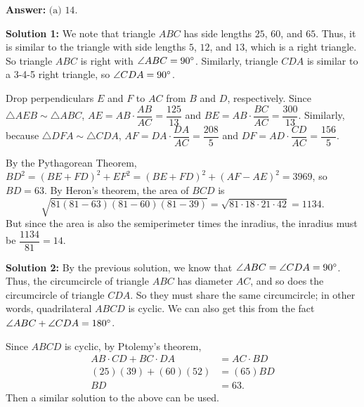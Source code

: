 \documentclass[11pt,paper=letter]{scrartcl}
\begin{document}
\begin{enumerate}[left=0pt]
\textbf{Answer:} $\boxed{\text{(a) }14}$.

\textbf{Solution 1:} We note that triangle $ABC$ has side lengths $25$, $60$, and $65$. Thus, it is similar to the triangle with side lengths $5$, $12$, and $13$, which is a right triangle. So triangle $ABC$ is right with $\angle ABC = 90^\circ$. Similarly, triangle $CDA$ is similar to a 3-4-5 right triangle, so $\angle CDA = 90^\circ$. 
\begin{center}
\end{center}
Drop perpendiculars $E$ and $F$ to $AC$ from $B$ and $D$, respectively. Since $\triangle AEB \sim \triangle ABC$, $AE = AB \cdot \dfrac{AB}{AC} = \dfrac{125}{13}$ and $BE = AB \cdot \dfrac{BC}{AC} = \dfrac{300}{13}$. Similarly, because $\triangle DFA \sim \triangle CDA$, $AF = DA \cdot \dfrac{DA}{AC} = \dfrac{208}5$ and $DF = AD \cdot \dfrac{CD}{AC} = \dfrac{156}5$.

By the Pythagorean Theorem, $BD^2 = (BE + FD)^2 + EF^2 = (BE + FD)^2 + (AF - AE)^2 = 3969$, so $BD = 63$. By Heron's theorem, the area of $BCD$ is $$\sqrt{81(81 - 63)(81 - 60)(81 - 39)} = \sqrt{81 \cdot 18 \cdot 21 \cdot 42} = 1134.$$ But since the area is also the semiperimeter times the inradius, the inradius must be $\dfrac{1134}{81} = 14$.

\textbf{Solution 2:} By the previous solution, we know that $\angle ABC = \angle CDA = 90^\circ$. Thus, the circumcircle of triangle $ABC$ has diameter $AC$, and so does the circumcircle of triangle $CDA$. So they must share the same circumcircle; in other words, quadrilateral $ABCD$ is cyclic. We can also get this from the fact $\angle ABC + \angle CDA = 180^\circ$.

Since $ABCD$ is cyclic, by Ptolemy's theorem, \begin{align*}
AB \cdot CD + BC \cdot DA &= AC \cdot BD \\
(25)(39) + (60)(52) &= (65)BD \\
BD &= 63.\end{align*} Then a similar solution to the above can be used.


\end{enumerate}
\end{document}
